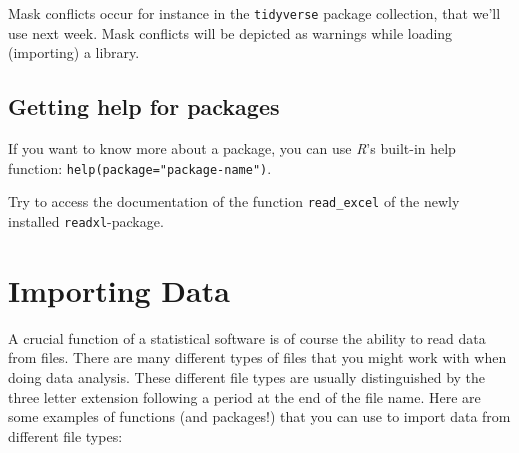 \documentclass[
]{scrartcl}
\makeatletter
\newenvironment{kframe}{%
\medskip{}
\setlength{\fboxsep}{.8em}
 \def\at@end@of@kframe{}%
 \ifinner\ifhmode%
  \def\at@end@of@kframe{\end{minipage}}%
  \begin{minipage}{\columnwidth}%
 \fi\fi%
 \def\FrameCommand##1{\hskip\@totalleftmargin \hskip-\fboxsep
 \colorbox{shadecolor}{##1}\hskip-\fboxsep
     \hskip-\linewidth \hskip-\@totalleftmargin \hskip\columnwidth}%
 \MakeFramed {\advance\hsize-\width
   \@totalleftmargin\z@ \linewidth\hsize
   \@setminipage}}%
 {\par\unskip\endMakeFramed%
 \at@end@of@kframe}
\newenvironment{rmdblock}[1]
  {
  \begin{itemize}
  \renewcommand{\labelitemi}{
    \raisebox{-.7\height}[0pt][0pt]{
      {\setkeys{Gin}{width=3em,keepaspectratio}\texttt{[image: images/\#1]}}
    }
  }
  \setlength{\fboxsep}{1em}
  \begin{kframe}
  \item
  }
  {
  \end{kframe}
  \end{itemize}
  }
\newenvironment{geek}
    {\begin{rmdblock}{geek}}
    {\end{rmdblock}}
\newenvironment{myexercise}
    {\begin{rmdblock}{exercise_green}}
    {\end{rmdblock}}
\makeatother
\begin{document}
\begin{geek}
Mask conflicts occur for instance in the \texttt{tidyverse} package
collection, that we'll use next week. Mask conflicts will be depicted as
warnings while loading (importing) a library.
\end{geek}

\subsection{Getting help for packages}\label{getting-help-for-packages}

If you want to know more about a package, you can use \emph{R}'s built-in help function: \texttt{help(package="package-name")}.

\begin{myexercise}
Try to access the documentation of the function \texttt{read\_excel} of
the newly installed \texttt{readxl}-package.
\end{myexercise}

\section{Importing Data}\label{importing-data}

A crucial function of a statistical software is of course the ability to read data from files. There are many different types of files that you might work with when doing data analysis. These different file types are usually distinguished by the three letter extension following a period at the end of the file name. Here are some examples of functions (and packages!) that you can use to import data from different file types:
\end{document}
